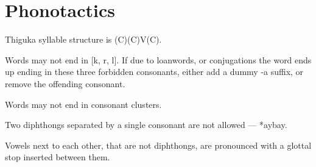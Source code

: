 \section{Phonotactics}
Thiguka syllable structure is (C)(C)V(C).

Words may not end in [k, r, l].
If due to loanwords, or conjugations the word ends up ending in these three forbidden consonants, either add a dummy -a suffix, or remove the offending consonant.

Words may not end in consonant clusters.

Two diphthongs separated by a single consonant are not allowed --- *aybay. 

Vowels next to each other, that are not diphthongs, are pronounced with a glottal stop inserted between them.
